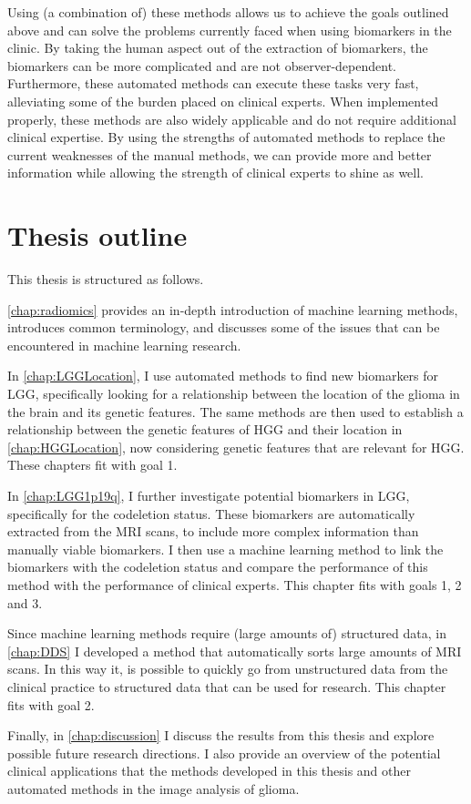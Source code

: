Using (a combination of) these methods allows us to achieve the goals outlined above and can solve the problems currently faced when using biomarkers in the clinic.
By taking the human aspect out of the extraction of biomarkers, the biomarkers can be more complicated and are not observer-dependent.
Furthermore, these automated methods can execute these tasks very fast, alleviating some of the burden placed on clinical experts.
When implemented properly, these methods are also widely applicable and do not require additional clinical expertise.
By using the strengths of automated methods to replace the current weaknesses of the manual methods, we can provide more and better information while allowing the strength of clinical experts to shine as well.

\section{Thesis outline}

This thesis is structured as follows.

\cref{chap:radiomics} provides an in-depth introduction of machine learning methods, introduces common terminology, and discusses some of the issues that can be encountered in machine learning research.

In \cref{chap:LGGLocation}, I use automated methods to find new biomarkers for \gls{LGG}, specifically looking for a relationship between the location of the \gls{glioma} in the brain and its genetic features.
The same methods are then used to establish a relationship between the genetic features of \gls{HGG} and their location in \cref{chap:HGGLocation}, now considering genetic features that are relevant for \gls{HGG}.
These chapters fit with goal 1.

In \cref{chap:LGG1p19q}, I further investigate potential biomarkers in \gls{LGG}, specifically for the \gls{codeletion} status.
These biomarkers are automatically extracted from the \gls{MRI} scans, to include more complex information than manually viable biomarkers.
I then use a machine learning method to link the biomarkers with the \gls{codeletion} status and compare the performance of this method with the performance of clinical experts.
This chapter fits with goals 1, 2 and 3.

Since machine learning methods require (large amounts of) structured data, in \cref{chap:DDS} I developed a method that automatically sorts large amounts of \gls{MRI} scans.
In this way it, is possible to quickly go from unstructured data from the clinical practice to structured data that can be used for research.
This chapter fits with goal 2.

Finally, in \cref{chap:discussion} I discuss the results from this thesis and explore possible future research directions.
I also provide an overview of the potential clinical applications that the methods developed in this thesis and other automated methods in the image analysis of glioma.

